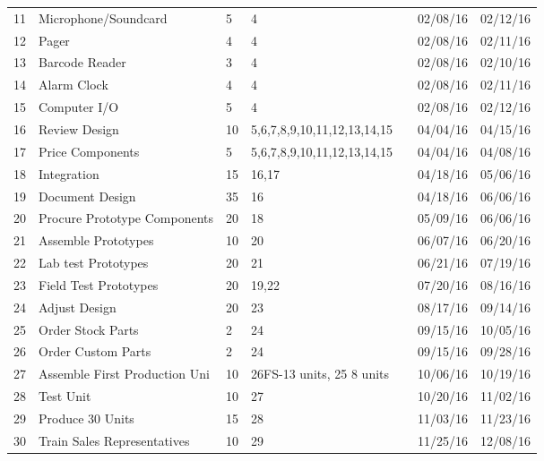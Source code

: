 \documentclass{article}
\begin{document}
\begin{table}[H]
\begin{tabular}{lllllll}
11       & Microphone/Soundcard          & 5        & 4                           &  & 02/08/16     & 02/12/16   \\
12       & Pager                         & 4        & 4                           &  & 02/08/16     & 02/11/16   \\
13       & Barcode Reader                & 3        & 4                           &  & 02/08/16     & 02/10/16   \\
14       & Alarm Clock                   & 4        & 4                           &  & 02/08/16     & 02/11/16   \\
15       & Computer I/O                  & 5        & 4                           &  & 02/08/16     & 02/12/16   \\
16       & Review Design                 & 10       & 5,6,7,8,9,10,11,12,13,14,15 &  & 04/04/16     & 04/15/16   \\
17       & Price Components              & 5        & 5,6,7,8,9,10,11,12,13,14,15 &  & 04/04/16     & 04/08/16   \\
18       & Integration                   & 15       & 16,17                       &  & 04/18/16     & 05/06/16   \\
19       & Document Design               & 35       & 16                          &  & 04/18/16     & 06/06/16   \\
20       & Procure Prototype Components  & 20       & 18                          &  & 05/09/16     & 06/06/16   \\
21       & Assemble Prototypes           & 10       & 20                          &  & 06/07/16     & 06/20/16   \\
22       & Lab test Prototypes           & 20       & 21                          &  & 06/21/16     & 07/19/16   \\
23       & Field Test Prototypes         & 20       & 19,22                       &  & 07/20/16     & 08/16/16   \\
24       & Adjust Design                 & 20       & 23                          &  & 08/17/16     & 09/14/16   \\
25       & Order Stock Parts             & 2        & 24                          &  & 09/15/16     & 10/05/16   \\
26       & Order Custom Parts            & 2        & 24                          &  & 09/15/16     & 09/28/16   \\
27       & Assemble First Production Uni & 10       & 26FS-13 units, 25 8 units   &  & 10/06/16     & 10/19/16   \\
28       & Test Unit                     & 10       & 27                          &  & 10/20/16     & 11/02/16   \\
29       & Produce 30 Units              & 15       & 28                          &  & 11/03/16     & 11/23/16   \\
30       & Train Sales Representatives   & 10       & 29                          &  & 11/25/16     & 12/08/16  
\end{tabular}
\end{table}
\end{document}
